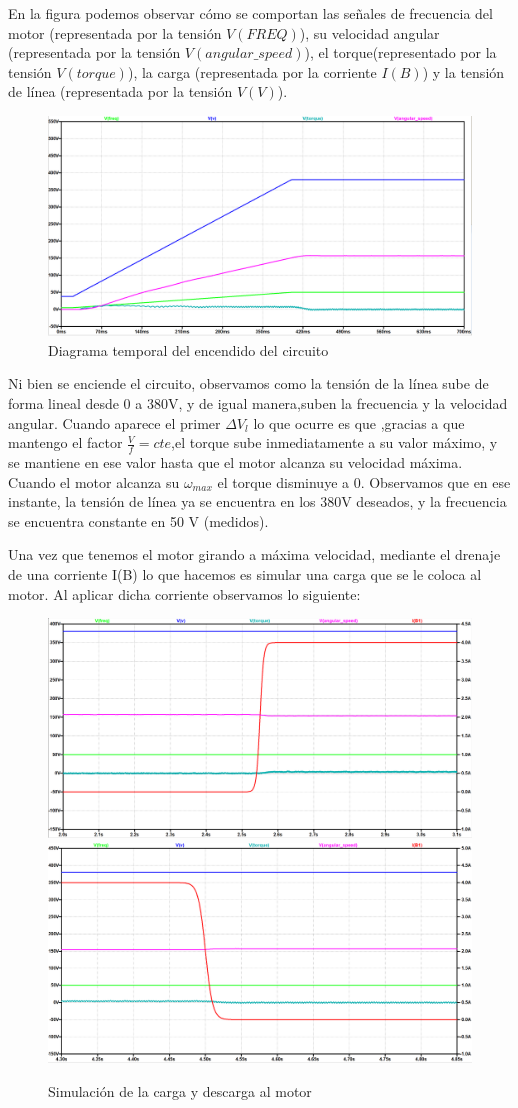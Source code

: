 \documentclass[e4_tp3_main.tex]{subfiles}
\begin{document}
En la figura podemos observar cómo se comportan las señales de frecuencia del motor (representada por la tensión $V(FREQ)$), su velocidad angular (representada por la tensión $V(angular\_speed)$), el torque(representado por la tensión $V(torque)$), la carga (representada por la corriente $I(B)$) y la tensión de línea (representada por la tensión $V(V)$).
\begin{figure}[H]
\centering
\includegraphics[width=0.7\linewidth]{Imagenes/3-1-a-inicio.png}
\caption{Diagrama temporal del encendido del circuito}
\end{figure}

Ni bien se enciende el circuito, observamos como la tensión de la línea sube de forma lineal desde 0 a 380V, y de igual manera,suben la frecuencia y la velocidad angular. Cuando aparece el primer $\Delta V_l$ lo que ocurre es que ,gracias a que mantengo el factor $\frac{V}{f}=cte$,el torque sube inmediatamente a su valor máximo, y se mantiene en ese valor hasta que el motor alcanza su velocidad máxima. Cuando el motor alcanza su $\omega_{max}$ el torque disminuye a 0. Observamos que en ese instante, la tensión de línea ya se encuentra en los 380V deseados, y la frecuencia se encuentra constante en 50 V (medidos).

Una vez que tenemos el motor girando a máxima velocidad, mediante el drenaje de una corriente I(B) lo que hacemos es simular una carga que se le coloca al motor. Al aplicar dicha corriente observamos lo siguiente:
\begin{figure}[H]
\centering
\includegraphics[width=0.45\linewidth]{Imagenes/3-1-a-carga.png}
\includegraphics[width=0.45\linewidth]{Imagenes/3-1-a-descarga.png}
\caption{Simulación de la carga y descarga al motor}
\end{figure}
\end{document}
